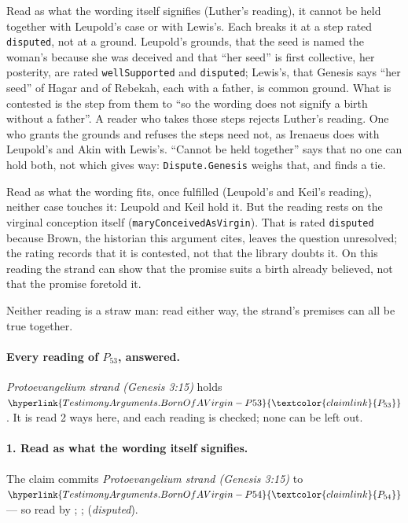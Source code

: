 \documentclass[11pt]{article}
\newcommand{\pvar}[2]{\hyperlink{#1-P#2}{\textcolor{claimlink}{P_{#2}}}}
\begin{document}
Read as what the wording itself signifies (Luther’s reading), it cannot be held together with Leupold’s case or with Lewis’s. Each breaks it at a step rated \texttt{disputed}, not at a ground. Leupold’s grounds, that the seed is named the woman’s because she was deceived and that “her seed” is first collective, her posterity, are rated \texttt{well\allowbreak{}Supported} and \texttt{disputed}; Lewis’s, that Genesis says “her seed” of Hagar and of Rebekah, each with a father, is common ground. What is contested is the step from them to “so the wording does not signify a birth without a father”. A reader who takes those steps rejects Luther’s reading. One who grants the grounds and refuses the steps need not, as Irenaeus does with Leupold’s and Akin with Lewis’s. “Cannot be held together” says that no one can hold both, not which gives way: \texttt{Dispute.Genesis} weighs that, and finds a tie.

Read as what the wording fits, once fulfilled (Leupold’s and Keil’s reading), neither case touches it: Leupold and Keil hold it. But the reading rests on the virginal conception itself (\texttt{mary\allowbreak{}Conceived\allowbreak{}As\allowbreak{}Virgin}). That is rated \texttt{disputed} because Brown, the historian this argument cites, leaves the question unresolved; the rating records that it is contested, not that the library doubts it. On this reading the strand can show that the promise suits a birth already believed, not that the promise foretold it.

Neither reading is a straw man: read either way, the strand’s premises can all be true together.

\paragraph{Every reading of \(P_{53}\), answered.} \emph{Protoevangelium strand (Genesis 3:15)} holds \(\pvar{TestimonyArguments.BornOfAVirgin}{53}\). It is read 2 ways here, and each reading is checked; none can be left out.

\paragraph{1. Read as what the wording itself signifies.} The claim commits \emph{Protoevangelium strand (Genesis 3:15)} to \(\pvar{TestimonyArguments.BornOfAVirgin}{54}\) --- so read by \cite[298--299]{luther-on-the-creation-1904}; \cite{miravalle-meet-your-mother-2014}; \cite[ad loc. Gen 3:15]{henry-commentary-whole-bible} (\emph{disputed}).
\end{document}
